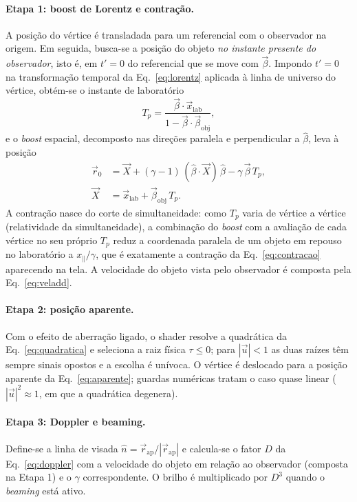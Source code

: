 \documentclass[10pt,a4paper,twocolumn]{article}
\begin{document}
\paragraph{Etapa 1: boost de Lorentz e contração.} A posição do vértice é transladada
para um referencial com o observador na origem. Em seguida, busca-se a posição do objeto
\emph{no instante presente do observador}, isto é, em $t' = 0$ do
referencial que se move com $\vec{\beta}$. Impondo $t' = 0$ na transformação temporal da
Eq.~\eqref{eq:lorentz} aplicada à linha de universo do vértice, obtém-se o instante de
laboratório
\begin{equation}
  T_{p} = \frac{\vec{\beta}\cdot\vec{x}_{\mathrm{lab}}}
               {1 - \vec{\beta}\cdot\vec{\beta}_{\mathrm{obj}}},
  \label{eq:tp}
\end{equation}
e o \emph{boost} espacial, decomposto nas direções paralela e perpendicular a
$\hat{\beta}$, leva à posição
\begin{equation}
  \begin{aligned}
    \vec{r}_{0} &= \vec{X} + (\gamma - 1)\,(\hat{\beta}\cdot\vec{X})\,\hat{\beta}
                   - \gamma\,\vec{\beta}\,T_{p},\\
    \vec{X} &= \vec{x}_{\mathrm{lab}} + \vec{\beta}_{\mathrm{obj}}\,T_{p}.
  \end{aligned}
  \label{eq:boost}
\end{equation}
A contração nasce do corte de simultaneidade: como $T_{p}$ varia de vértice a vértice
(relatividade da simultaneidade), a combinação do \emph{boost} com a avaliação de cada
vértice no seu próprio $T_{p}$ reduz a coordenada paralela de um objeto em repouso no
laboratório a $x_{\parallel}/\gamma$, que é exatamente a contração da
Eq.~\eqref{eq:contracao} aparecendo na tela. A velocidade do objeto vista pelo observador
é composta pela Eq.~\eqref{eq:veladd}.

\paragraph{Etapa 2: posição aparente.} Com o efeito de aberração ligado, o shader
resolve a quadrática da Eq.~\eqref{eq:quadratica} e seleciona a raiz física
$\tau \leq 0$; para $|\vec{u}| < 1$ as duas raízes têm sempre sinais opostos e a
escolha é unívoca. O vértice é deslocado para a posição aparente da
Eq.~\eqref{eq:aparente}; guardas numéricas tratam o caso quase linear
($|\vec{u}|^{2} \approx 1$, em que a quadrática degenera).

\paragraph{Etapa 3: Doppler e beaming.} Define-se a linha de visada
$\hat{n} = \vec{r}_{\mathrm{ap}}/|\vec{r}_{\mathrm{ap}}|$ e calcula-se o fator $D$ da
Eq.~\eqref{eq:doppler} com a velocidade do objeto em relação ao observador (composta na
Etapa 1) e o $\gamma$ correspondente. O brilho é multiplicado por
$D^{3}$ quando o \emph{beaming} está ativo.
\end{document}
